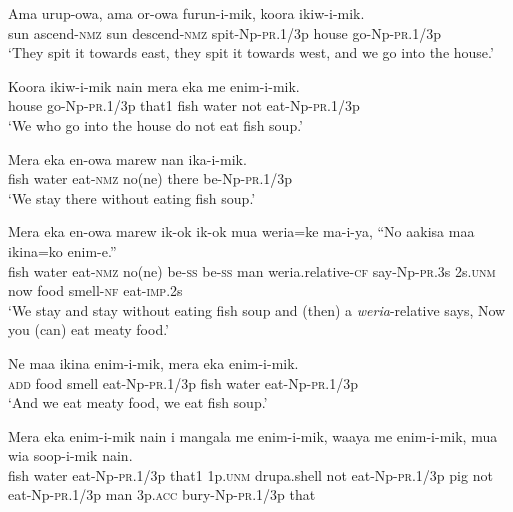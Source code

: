\ea
\gll  Ama  urup-owa,  ama  or-owa  furun-i-mik,  koora  ikiw-i-mik. \\
sun  ascend-\textsc{nmz}  sun  descend-\textsc{nmz}  spit-Np-\textsc{pr}.1/3p  house  go-Np-\textsc{pr}.1/3p \\
\glt ‘They spit it towards east, they spit it towards west, and we go into the house.’ \\
\z


\ea
\gll  Koora  ikiw-i-mik  nain  mera  eka  me  enim-i-mik. \\
house  go-Np-\textsc{pr}.1/3p  that1  fish  water  not  eat-Np-\textsc{pr}.1/3p \\
\glt ‘We who go into the house do not eat fish soup.’ \\
\z


\ea
\gll  Mera  eka  en-owa  marew  nan  ika-i-mik. \\
fish  water  eat-\textsc{nmz}  no(ne)  there  be-Np-\textsc{pr}.1/3p \\
\glt ‘We stay there without eating fish soup.’ \\
\z


\ea
\gll  Mera  eka  en-owa  marew  ik-ok  ik-ok  mua  weria=ke  ma-i-ya,            “No  aakisa  maa  ikina=ko  enim-e.” \\
fish  water  eat-\textsc{nmz}  no(ne)  be-\textsc{ss}  be-\textsc{ss}  man  weria.relative-\textsc{cf}  say-Np-\textsc{pr}.3s 2s.\textsc{unm}  now  food  smell-\textsc{nf}  eat-\textsc{imp}.2s \\


\glt ‘We stay and stay without eating fish soup and (then) a \textit{weria}{}-relative says, Now you (can) eat meaty food.’ \\
\z


\ea
\gll  Ne  maa  ikina  enim-i-mik,  mera  eka  enim-i-mik. \\
\textsc{add}  food  smell  eat-Np-\textsc{pr}.1/3p  fish  water  eat-Np-\textsc{pr}.1/3p \\
\glt ‘And we eat meaty food, we eat fish soup.’ \\
\z


\ea
\gll  Mera  eka  enim-i-mik  nain  i  mangala  me  enim-i-mik,               waaya  me  enim-i-mik,  mua  wia  soop-i-mik  nain. \\
fish  water  eat-Np-\textsc{pr}.1/3p  that1  1p.\textsc{unm}  drupa.shell  not  eat-Np-\textsc{pr}.1/3p pig  not  eat-Np-\textsc{pr}.1/3p  man  3p.\textsc{acc}  bury-Np-\textsc{pr}.1/3p  that \\


